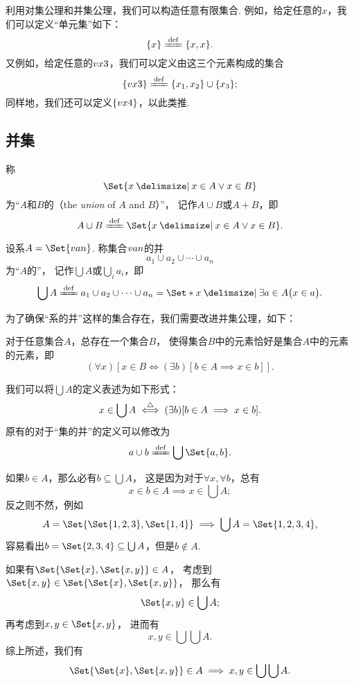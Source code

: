 利用对集公理和并集公理，我们可以构造任意有限集合.
例如，给定任意的\(x\)，我们可以定义“单元集”如下：\[
\{x\} \defeq \{x, x\}.
\]
又例如，给定任意的\(v{x}{3}\)，我们可以定义由这三个元素构成的集合
\[
	\{\v{x}{3}\} \defeq \{x_1,x_2\}\cup\{x_3\};
\]
同样地，我们还可以定义\(\{v{x}{4}\}\)，以此类推.


\subsection{并集}
\begin{definition}
称\[
	\Set{ x \given x \in A \lor x \in B }
\]为“\(A\)和\(B\)的（the \emph{union} of \(A\) and \(B\)）”，
记作\(A \cup B\)或\(A+B\)，即\[
	A \cup B \defeq \Set{ x \given x \in A \lor x \in B }.
\]
\end{definition}


\begin{definition}
设系\(A = \Set{\v{a}{n}}\).
称集合\(v{a}{n}\)的并\[
	a_1 \cup a_2 \cup \dotsb \cup a_n
\]为“\(A\)的”，
记作\(\bigcup A\)或\(\bigcup\limits_i a_i\)，即\[
	\bigcup A
	\defeq
	a_1 \cup a_2 \cup \dotsb \cup a_n
	= \Set*{ x \given \exists a \in A \bigl( x \in a \bigr) }.
\]
\end{definition}


为了确保“系的并”这样的集合存在，我们需要改进并集公理，如下：
\begin{axiom}[并集公理II]
对于任意集合\(A\)，总存在一个集合\(B\)，
使得集合\(B\)中的元素恰好是集合\(A\)中的元素的元素，即\[
	(\forall x)[
		x \in B
		\iff
		(\exists b)[b \in A \implies x \in b]
	].
\]
\end{axiom}

我们可以将\(\bigcup A\)的定义表述为如下形式：\[
	x \in \bigcup A
	\overset{\triangle}{\iff}
	(\exists b)[b \in A \implies x \in b].
\]
原有的对于“集的并”的定义可以修改为\[
	a \cup b \defeq \bigcup\Set{a,b}.
\]

\begin{example}
如果\(b \in A\)，那么必有\(b \subseteq \bigcup A\)，
这是因为对于\(\forall x, \forall b\)，总有\[
	x \in b \in A
	\implies
	x \in \bigcup A;
\]
反之则不然，例如\[
	A = \Set{\Set{1,2,3},\Set{1,4}}
	\implies
	\bigcup A = \Set{1,2,3,4},
\]
容易看出\(b = \Set{2,3,4} \subseteq \bigcup A\)，但是\(b \notin A\).
\end{example}

\begin{example}\label{example:集合论.有序对各坐标的取值范围}
如果有\(\Set{ \Set{x}, \Set{x,y} } \in A\)，
考虑到\(\Set{x,y} \in \Set{ \Set{x}, \Set{x,y} }\)，
那么有\[
	\Set{x,y} \in \bigcup A;
\]
再考虑到\(x,y \in \Set{x,y}\)，
进而有\[
	x,y \in \bigcup\bigcup A.
\]
综上所述，我们有
\begin{equation}
	\Set{ \Set{x}, \Set{x,y} } \in A
	\implies
	x,y \in \bigcup\bigcup A.
\end{equation}
\end{example}


